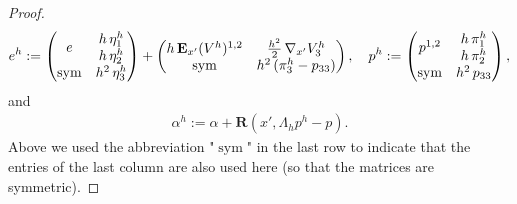 \documentclass[reqno,10pt]{amsart}
\numberwithin{equation}{section}
\theoremstyle{remark}
\newcommand{\BLACK}{\color{black}}
\newcommand{\PINK}{\color{black}}
\DeclareMathOperator{\sym}{sym}
\newcommand{\E}{{\bf E}}
\newcommand{\disspot}{\mathbf{R}}
\begin{document}
\begin{proof}
\begin{align*}
	e^h := \begin{pmatrix} \begin{matrix} e \end{matrix} & \begin{matrix} h\,\eta^h_1 \\ h\,\eta^h_2 \end{matrix} \\ \begin{matrix} \sym \end{matrix} & h^2\,\eta^h_3 \end{pmatrix} + \begin{pmatrix} h\,{\E}_{x'}(V^h)^{1,2} & \frac{h^2}{2}\,\nabla_{x'}V^h_3 \\ \sym & h^2\,(\pi^h_3 - p_{33}) \end{pmatrix}, \quad
	p^h := \begin{pmatrix} \begin{matrix} p^{1,2} \end{matrix} & \begin{matrix} h\,\pi^h_1 \\ h\,\pi^h_2 \end{matrix} \\ \begin{matrix} \sym \end{matrix} & h^2\,p_{33} \end{pmatrix},
\end{align*}
and
\begin{align*}
	\alpha^h := \alpha + \disspot(x', \Lambda_h p^h - p).
\end{align*}
{\PINK Above we used the abbreviation "$\sym$" in the last row to indicate that the entries of the last column are also used here (so that the matrices are symmetric).\BLACK}


\end{proof}
\end{document}
